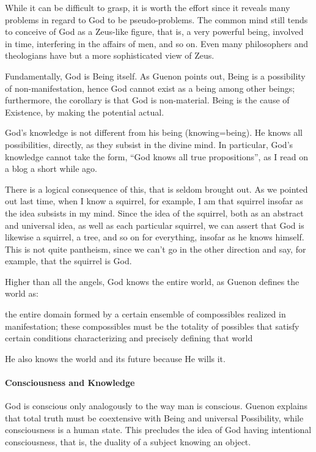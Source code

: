 While it can be difficult to grasp, it is worth the effort since it reveals many problems in regard to God to be pseudo-problems. The common mind still tends to conceive of God as a Zeus-like figure, that is, a very powerful being, involved in time, interfering in the affairs of men, and so on. Even many philosophers and theologians have but a more sophisticated view of Zeus.

Fundamentally, God is Being itself. As Guenon points out, Being is a possibility of non-manifestation, hence God cannot exist as a being among other beings; furthermore, the corollary is that God is non-material. Being is the cause of Existence, by making the potential actual.

God's knowledge is not different from his being (knowing=being). He knows all possibilities, directly, as they subsist in the divine mind. In particular, God's knowledge cannot take the form, “God knows all true propositions”, as I read on a blog a short while ago.

There is a logical consequence of this, that is seldom brought out. As we pointed out last time, when I know a squirrel, for example, I am that squirrel insofar as the idea subsists in my mind. Since the idea of the squirrel, both as an abstract and universal idea, as well as each particular squirrel, we can assert that God is likewise a squirrel, a tree, and so on for everything, insofar as he knows himself. This is not quite pantheism, since we can't go in the other direction and say, for example, that the squirrel is God.

Higher than all the angels, God knows the entire world, as Guenon defines the world as:

\begin{quotex}
the entire domain formed by a certain ensemble of compossibles realized in manifestation; these compossibles must be the totality of possibles that satisfy certain conditions characterizing and precisely defining that world

\end{quotex}
He also knows the world and its future because He wills it.

\paragraph{Consciousness and Knowledge}
God is conscious only analogously to the way man is conscious. Guenon explains that total truth must be coextensive with Being and universal Possibility, while consciousness is a human state. This precludes the idea of God having intentional consciousness, that is, the duality of a subject knowing an object.

